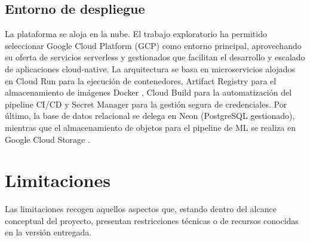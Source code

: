 \subsection{Entorno de despliegue}

La plataforma se aloja en la nube. El trabajo exploratorio ha permitido seleccionar Google Cloud Platform (GCP) \cite{cloud_run2026} como entorno principal,
aprovechando su oferta de servicios serverless y gestionados que facilitan el desarrollo y escalado de aplicaciones cloud-native. La arquitectura se basa en
microservicios alojados en Cloud Run para la ejecución de contenedores, Artifact Registry \cite{artifact_registry} para el almacenamiento de imágenes
Docker \cite{docker}, Cloud Build \cite{cloud_build2026} para la automatización del pipeline CI/CD y Secret Manager \cite{secret_manager} para la gestión
segura de credenciales. Por último, la base de datos relacional se delega en Neon (PostgreSQL gestionado), mientras que el almacenamiento de objetos para
el pipeline de ML se realiza en Google Cloud Storage \cite{cloud_storage2026}.

\section{Limitaciones}

Las limitaciones recogen aquellos aspectos que, estando dentro del alcance
conceptual del proyecto, presentan restricciones técnicas o de recursos
conocidas en la versión entregada.

